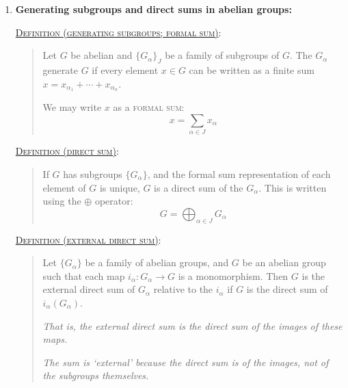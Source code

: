 \documentclass[letterpaper, 12pt]{article}
\newcommand{\defn}[2]{\textsc{\underline{Definition (#1)}:}\begin{quote} #2\end{quote}}
\begin{document}
\begin{enumerate}[resume]
            \defn{normal subgroup}{A subgroup $H$ of $G$ is a normal subgroup if for each $h\in H$ and $x\in G$, $x\cdot h\cdot x^{-1}$ is in $H$.

            \textit{Explanation: It helps to consider two more definitions. The \textsc{left coset} is $xH = \{xh\,|\,h\in H\}$ for some fixed $x\in G$. The \textsc{right coset} is $Hx = \{hx\,|\,h\in H\}$ for some fixed $x\in G$. Both the left cosets and right cosets form partitions of $G$, but they may be different. The two partitions are the same if and only if $xH = Hx$, which is the definition of a normal subgroup.}}

            \defn{quotient group}{If $H$ is a normal subgroup, the quotient $G/H$ is the group composed of the cosets of $H$ (the operations between them are inherited from $G$).

            \textit{That is, if two elements are in the same coset, they are considered equivalent.}}
        \item \textbf{Generating subgroups and direct sums in abelian groups:} %

            \defn{generating subgroups; formal sum}{Let $G$ be abelian and $\{G_\alpha\}_J$ be a family of subgroups of $G$. The $G_\alpha$ generate $G$ if every element $x\in G$ can be written as a finite sum $x = x_{\alpha_1} + \cdots + x_{\alpha_n}$.

            We may write $x$ as a \textsc{formal sum}: \[x = \sum_{\alpha\in J} x_\alpha\]}

            \defn{direct sum}{If $G$ has subgroups $\{G_\alpha\}$, and the formal sum representation of each element of $G$ is unique, $G$ is a direct sum of the $G_\alpha$. This is written using the $\oplus$ operator: \[
                G = \bigoplus_{\alpha\in J} G_\alpha
            \]}

            \defn{external direct sum}{Let $\{G_\alpha\}$ be a family of abelian groups, and $G$ be an abelian group such that each map $i_\alpha : G_\alpha \to G$ is a monomorphism. Then $G$ is the external direct sum of $G_\alpha$ relative to the $i_\alpha$ if $G$ is the direct sum of $i_\alpha(G_\alpha)$.

            \textit{That is, the external direct sum is the direct sum of the images of these maps.}

            \textit{The sum is `external' because the direct sum is of the images, not of the subgroups themselves.}

}
\end{enumerate}
\end{document}
